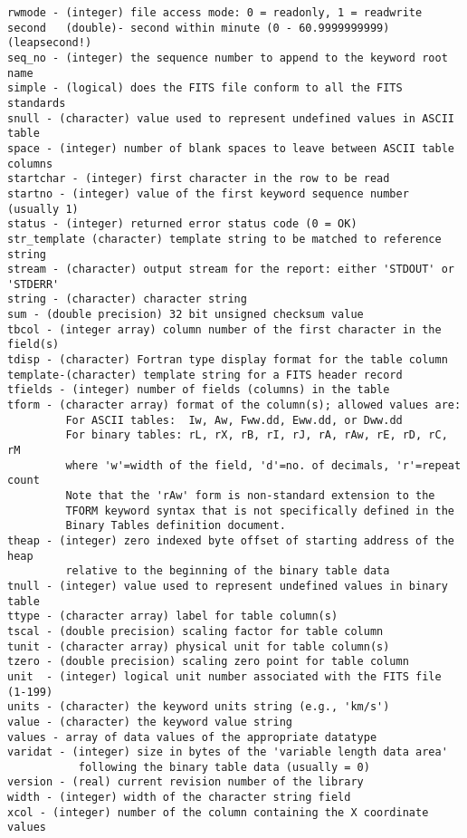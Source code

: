 \documentclass[11pt]{book}
\begin{document}
\begin{verbatim}
rwmode - (integer) file access mode: 0 = readonly, 1 = readwrite
second   (double)- second within minute (0 - 60.9999999999) (leapsecond!)
seq_no - (integer) the sequence number to append to the keyword root name
simple - (logical) does the FITS file conform to all the FITS standards
snull - (character) value used to represent undefined values in ASCII table
space - (integer) number of blank spaces to leave between ASCII table columns
startchar - (integer) first character in the row to be read
startno - (integer) value of the first keyword sequence number (usually 1)
status - (integer) returned error status code (0 = OK)
str_template (character) template string to be matched to reference string
stream - (character) output stream for the report: either 'STDOUT' or 'STDERR'
string - (character) character string
sum - (double precision) 32 bit unsigned checksum value
tbcol - (integer array) column number of the first character in the field(s)
tdisp - (character) Fortran type display format for the table column
template-(character) template string for a FITS header record
tfields - (integer) number of fields (columns) in the table
tform - (character array) format of the column(s); allowed values are:
         For ASCII tables:  Iw, Aw, Fww.dd, Eww.dd, or Dww.dd
         For binary tables: rL, rX, rB, rI, rJ, rA, rAw, rE, rD, rC, rM
         where 'w'=width of the field, 'd'=no. of decimals, 'r'=repeat count
         Note that the 'rAw' form is non-standard extension to the
         TFORM keyword syntax that is not specifically defined in the
         Binary Tables definition document.
theap - (integer) zero indexed byte offset of starting address of the heap
         relative to the beginning of the binary table data
tnull - (integer) value used to represent undefined values in binary table
ttype - (character array) label for table column(s)
tscal - (double precision) scaling factor for table column
tunit - (character array) physical unit for table column(s)
tzero - (double precision) scaling zero point for table column
unit  - (integer) logical unit number associated with the FITS file (1-199)
units - (character) the keyword units string (e.g., 'km/s')
value - (character) the keyword value string
values - array of data values of the appropriate datatype
varidat - (integer) size in bytes of the 'variable length data area'
           following the binary table data (usually = 0)
version - (real) current revision number of the library
width - (integer) width of the character string field
xcol - (integer) number of the column containing the X coordinate values

\end{verbatim}
\end{document}
